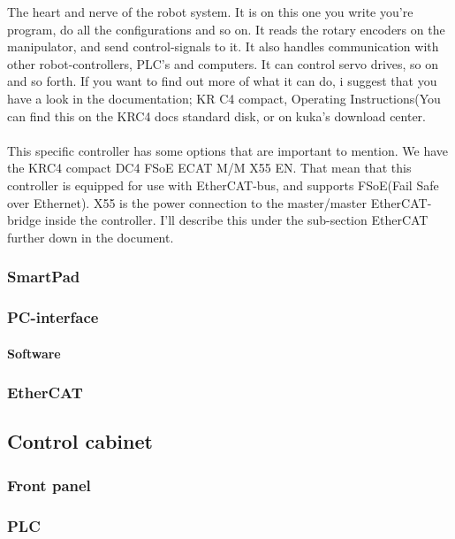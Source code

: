 \documentclass{article}
\begin{document}
        The heart and nerve of the robot system. It is on this one you write you're program, do all the configurations and so on. It reads the rotary encoders on the manipulator, and send control-signals to it. It also handles communication with other robot-controllers, PLC's and computers. It can control servo drives, so on and so forth. If you want to find out more of what it can do, i suggest that you have a look in the documentation; KR C4 compact, Operating Instructions(You can find this on the KRC4 docs standard disk, or on kuka's download center.
        \\\\
        This specific controller has some options that are important to mention. We have the KRC4 compact DC4 FSoE ECAT M/M X55 EN. That mean that this controller is equipped for use with EtherCAT-bus, and supports FSoE(Fail Safe over Ethernet).  X55 is the power connection to the master/master EtherCAT-bridge inside the controller. I'll describe this under the sub-section EtherCAT further down in the document.
        
\newpage

        \subsubsection{SmartPad}
        \subsubsection{PC-interface}
        \paragraph{Software}
        \subsubsection{EtherCAT}
        
\newpage

    \subsection{Control cabinet}
        \subsubsection{Front panel}
        \subsubsection{PLC}
\end{document}
